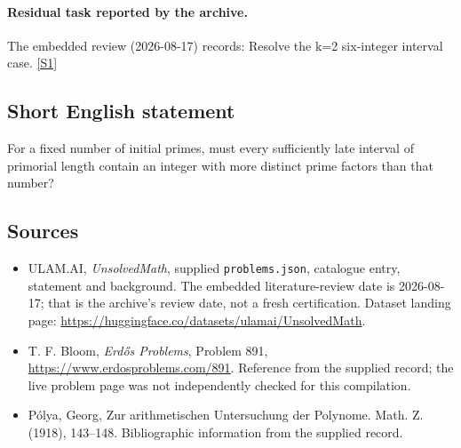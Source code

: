 \documentclass[11pt,a4paper]{article}
\newcommand{\sref}[2]{\hyperlink{source:#1:#2}{[S#2]}}
\begin{document}
\paragraph{Residual task reported by the archive.}

The embedded review (2026-08-17) records: Resolve the k=2 six-integer interval case. \sref{statement}{1}

\subsection{Short English statement}

For a fixed number of initial primes, must every sufficiently late interval of primorial length contain an integer with more distinct prime factors than that number?

\subsection{Sources}

{\small

\begin{itemize}

\item[\hypertarget{source:statement:1}{S1}] ULAM.AI, \emph{UnsolvedMath}, supplied \texttt{problems.json}, catalogue entry, statement and background. The embedded literature-review date is 2026-08-17; that is the archive’s review date, not a fresh certification. Dataset landing page: \url{https://huggingface.co/datasets/ulamai/UnsolvedMath}.

\item[\hypertarget{source:statement:2}{S2}] T. F. Bloom, \emph{Erdős Problems}, Problem 891, \url{https://www.erdosproblems.com/891}. Reference from the supplied record; the live problem page was not independently checked for this compilation.

\item[\hypertarget{source:statement:3}{S3}] P\'{o}lya, Georg, Zur arithmetischen {U}ntersuchung der {P}olynome. Math. Z. (1918), 143--148. Bibliographic information from the supplied record.

\end{itemize}

}

\label{end:statement}
\end{document}
